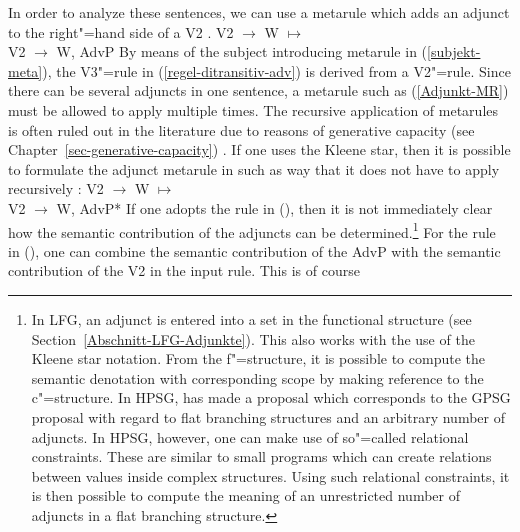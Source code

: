 \noindent
In order to analyze these sentences, we can use a metarule which adds an adjunct to the right"=hand side of a V2 \citep[]{Uszkoreit87a}.
\ea
\label{Adjunkt-MR}
V2  $\to$ W $\mapsto$\\
V2  $\to$ W, AdvP
\z 
By means of the subject introducing metarule in (\ref{subjekt-meta}), the V3"=rule in (\ref{regel-ditransitiv-adv}) is derived from a V2"=rule.
Since there can be several adjuncts in one sentence, a metarule such as (\ref{Adjunkt-MR}) must be allowed to apply multiple times. The recursive
application of metarules is often ruled out in the literature due to reasons of generative capacity (see
Chapter~\ref{sec-generative-capacity}) \parencites{Thompson82a-u}[]{Uszkoreit87a}. If one uses the Kleene star\is{*},
then it is possible to formulate the adjunct metarule in such as way that it does not have to apply recursively \citep[]{Uszkoreit87a}:
\ea
\label{adv-metarule}
V2  $\to$ W $\mapsto$\\
V2  $\to$ W, AdvP*
\z 
If one adopts the rule in (), then it is not immediately clear how the semantic contribution of the adjuncts can be determined.\footnote{%
	In LFG\indexlfg, an adjunct is entered into a set in the functional structure (see Section~\ref{Abschnitt-LFG-Adjunkte}). This also works with the use
	of the Kleene star notation. From the f"=structure, it is possible to compute the semantic denotation with corresponding scope by making reference
	to the c"=structure. In HPSG\indexhpsg, \citet{Kasper94a} has made a proposal which corresponds to the
        GPSG proposal with regard to flat branching structures and
	an arbitrary number of adjuncts. In HPSG, however, one can make use of so"=called relational constraints. These are similar to small programs which
	can create relations between values inside complex structures. Using such relational constraints, it is then possible to compute the meaning of
	an unrestricted number of adjuncts in a flat branching structure.
} For the rule in (), one can combine the semantic contribution of the AdvP with the semantic contribution of the V2 in the input rule. This is of course
